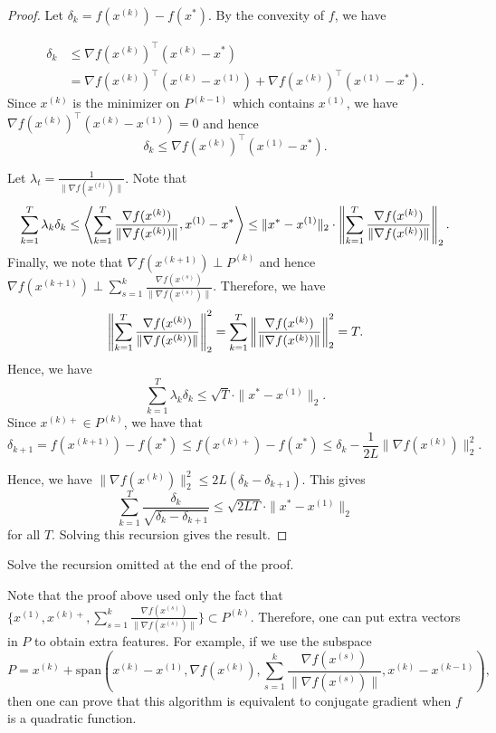 \begin{proof}
Let $\delta_{k}=f(x^{(k)})-f(x^{*})$. By the convexity of $f$, we
have

\begin{align*}
\delta_{k} & \leq\nabla f(x^{(k)})^{\top}(x^{(k)}-x^{*})\\
 & =\nabla f(x^{(k)})^{\top}(x^{(k)}-x^{(1)})+\nabla f(x^{(k)})^{\top}(x^{(1)}-x^{*}).
\end{align*}
Since $x^{(k)}$ is the minimizer on $P^{(k-1)}$ which contains $x^{(1)}$,
we have $\nabla f(x^{(k)})^{\top}(x^{(k)}-x^{(1)})=0$ and hence
\[
\delta_{k}\leq\nabla f(x^{(k)})^{\top}(x^{(1)}-x^{*}).
\]

Let $\lambda_{t}=\frac{1}{\|\nabla f(x^{(t)})\|}$. Note that
\[
\sum^{T}_{k=1}\lambda_{k}\delta_{k}\leq\left\langle \sum^{T}_{k=1}\frac{\nabla f(x^{(k)})}{\|\nabla f(x^{(k)})\|},x^{(1)}-x^{*}\right\rangle \leq\|x^{*}-x^{(1)}\|_{2}\cdot\left\Vert \sum^{T}_{k=1}\frac{\nabla f(x^{(k)})}{\|\nabla f(x^{(k)})\|}\right\Vert_{2}.
\]
Finally, we note that $\nabla f(x^{(k+1)})\perp P^{(k)}$ and hence
$\nabla f(x^{(k+1)})\perp\sum^{k}_{s=1}\frac{\nabla f(x^{(s)})}{\|\nabla f(x^{(s)})\|}$.
Therefore, we have 
\[
\left\Vert \sum^{T}_{k=1}\frac{\nabla f(x^{(k)})}{\|\nabla f(x^{(k)})\|}\right\Vert^{2}_{2}=\sum^{T}_{k=1}\left\Vert \frac{\nabla f(x^{(k)})}{\|\nabla f(x^{(k)})\|}\right\Vert^{2}_{2}=T.
\]
Hence, we have
\[
\sum^{T}_{k=1}\lambda_{k}\delta_{k}\leq\sqrt{T}\cdot\|x^{*}-x^{(1)}\|_{2}.
\]
Since $x^{(k)+}\in P^{(k)}$, we have that 
\[
\delta_{k+1}=f(x^{(k+1)})-f(x^{*})\leq f(x^{(k)+})-f(x^{*})\leq\delta_{k}-\frac{1}{2L}\|\nabla f(x^{(k)})\|^{2}_{2}.
\]

Hence, we have $\|\nabla f(x^{(k)})\|^{2}_{2}\leq2L(\delta_{k}-\delta_{k+1})$.
This gives
\[
\sum^{T}_{k=1}\frac{\delta_{k}}{\sqrt{\delta_{k}-\delta_{k+1}}}\leq\sqrt{2LT}\cdot\|x^{*}-x^{(1)}\|_{2}
\]
for all $T$. Solving this recursion gives the result.
\end{proof}
\begin{xca}
Solve the recursion omitted at the end of the proof.
\end{xca}

Note that the proof above used only the fact that $\{x^{(1)},x^{(k)+},\sum^{k}_{s=1}\frac{\nabla f(x^{(s)})}{\|\nabla f(x^{(s)})\|}\}\subset P^{(k)}$.
Therefore, one can put extra vectors in $P$ to obtain extra features.
For example, if we use the subspace
\[
P=x^{(k)}+\mathrm{span}(x^{(k)}-x^{(1)},\nabla f(x^{(k)}),\sum^{k}_{s=1}\frac{\nabla f(x^{(s)})}{\|\nabla f(x^{(s)})\|},x^{(k)}-x^{(k-1)}),
\]
then one can prove that this algorithm is equivalent to conjugate
gradient when $f$ is a quadratic function.

